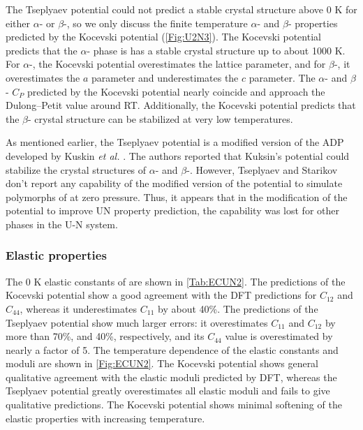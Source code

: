 \documentclass[preprint, 12pt]{elsarticle}
\begin{document}
The Tseplyaev potential could not predict a stable crystal structure above 0 K for either $\alpha$- or $\beta$-, so we only discuss the finite temperature $\alpha$- and $\beta$- properties predicted by the Kocevski potential (\cref{Fig:U2N3}). The Kocevski potential predicts that the $\alpha$- phase is has a stable crystal structure up to about 1000 K. For $\alpha$-, the Kocevski potential overestimates the lattice parameter, and for $\beta$-, it overestimates the $a$ parameter and underestimates the $c$ parameter. The $\alpha$- and $\beta$- $C_P$ predicted by the Kocevski potential nearly coincide and approach the Dulong–Petit value around RT. Additionally, the Kocevski potential predicts that the $\beta$- crystal structure can be stabilized at very low temperatures.

As mentioned earlier, the Tseplyaev potential is a modified version of the ADP developed by Kuskin \textit{et al.} \cite{Kuksin2016}. The authors reported that Kuksin's potential could stabilize the crystal structures of $\alpha$- and $\beta$-. However, Tseplyaev and Starikov \cite{Tseplyaev2016} don't report any capability of the modified version of the potential to simulate polymorphs of  at zero pressure. Thus, it appears that in the modification of the potential to improve UN property prediction, the capability was lost for other phases in the U-N system.



\subsubsection{Elastic properties}

The 0 K elastic constants of  are shown in \cref{Tab:ECUN2}. The predictions of the Kocevski potential show a good agreement with the DFT predictions for $C_{12}$ and $C_{44}$, whereas it underestimates $C_{11}$ by about 40\%. The predictions of the Tseplyaev potential show much larger errors: it overestimates $C_{11}$ and $C_{12}$ by more than 70\%, and 40\%, respectively, and its $C_{44}$ value is overestimated by nearly a factor of 5. The temperature dependence of the  elastic constants and moduli are shown in \cref{Fig:ECUN2}. The Kocevski potential shows general qualitative agreement with the  elastic moduli predicted by DFT, whereas the Tseplyaev potential greatly overestimates all elastic moduli and fails to give qualitative predictions. The Kocevski potential shows minimal softening of the  elastic properties with increasing temperature.
\end{document}
